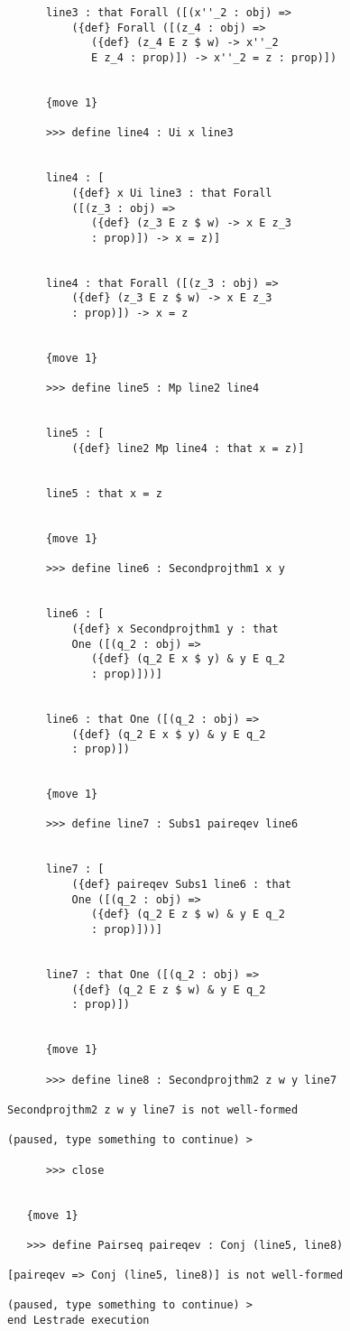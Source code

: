 \documentclass[12pt]{article}
\begin{document}
\begin{verbatim}
      line3 : that Forall ([(x''_2 : obj) => 
          ({def} Forall ([(z_4 : obj) => 
             ({def} (z_4 E z $ w) -> x''_2 
             E z_4 : prop)]) -> x''_2 = z : prop)])


      {move 1}

      >>> define line4 : Ui x line3


      line4 : [
          ({def} x Ui line3 : that Forall 
          ([(z_3 : obj) => 
             ({def} (z_3 E z $ w) -> x E z_3 
             : prop)]) -> x = z)]


      line4 : that Forall ([(z_3 : obj) => 
          ({def} (z_3 E z $ w) -> x E z_3 
          : prop)]) -> x = z


      {move 1}

      >>> define line5 : Mp line2 line4


      line5 : [
          ({def} line2 Mp line4 : that x = z)]


      line5 : that x = z


      {move 1}

      >>> define line6 : Secondprojthm1 x y


      line6 : [
          ({def} x Secondprojthm1 y : that 
          One ([(q_2 : obj) => 
             ({def} (q_2 E x $ y) & y E q_2 
             : prop)]))]


      line6 : that One ([(q_2 : obj) => 
          ({def} (q_2 E x $ y) & y E q_2 
          : prop)])


      {move 1}

      >>> define line7 : Subs1 paireqev line6


      line7 : [
          ({def} paireqev Subs1 line6 : that 
          One ([(q_2 : obj) => 
             ({def} (q_2 E z $ w) & y E q_2 
             : prop)]))]


      line7 : that One ([(q_2 : obj) => 
          ({def} (q_2 E z $ w) & y E q_2 
          : prop)])


      {move 1}

      >>> define line8 : Secondprojthm2 z w y line7

Secondprojthm2 z w y line7 is not well-formed

(paused, type something to continue) >

      >>> close


   {move 1}

   >>> define Pairseq paireqev : Conj (line5, line8)

[paireqev => Conj (line5, line8)] is not well-formed

(paused, type something to continue) >
end Lestrade execution
\end{verbatim}
\end{document}
